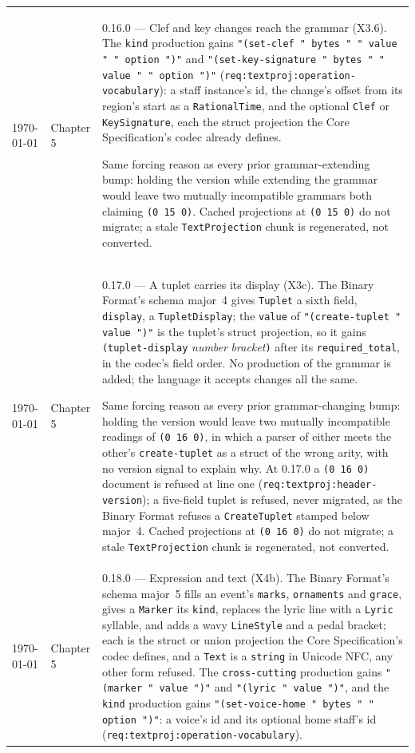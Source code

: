 \documentclass[11pt,letterpaper]{report}
\begin{document}
\begin{longtable}{p{2cm} p{2.5cm} p{9cm}}
    \today & Chapter 5 & 0.16.0 --- Clef and key changes reach the grammar
  (X3.6). The \texttt{kind} production gains
  \texttt{"(set-clef " bytes " " value " " option ")"} and
  \texttt{"(set-key-signature " bytes " " value " " option ")"}
  (\texttt{req:textproj:operation-vocabulary}): a staff instance's id, the
  change's offset from its region's start as a \texttt{RationalTime}, and the
  optional \texttt{Clef} or \texttt{KeySignature}, each the struct
  projection the Core Specification's codec already defines.

  Same forcing reason as every prior grammar-extending bump: holding the
  version while extending the grammar would leave two mutually incompatible
  grammars both claiming \texttt{(0 15 0)}. Cached projections at
  \texttt{(0 15 0)} do not migrate; a stale \texttt{TextProjection} chunk is
  regenerated, not converted. \\

    \today & Chapter 5 & 0.17.0 --- A tuplet carries its display (X3c). The
  Binary Format's schema major~4 gives \texttt{Tuplet} a sixth field,
  \texttt{display}, a \texttt{TupletDisplay}; the \texttt{value} of
  \texttt{"(create-tuplet " value ")"} is the tuplet's struct projection, so it
  gains \texttt{(tuplet-display} \emph{number} \emph{bracket}\texttt{)} after
  its \texttt{required\_total}, in the codec's field order. No production of
  the grammar is added; the language it accepts changes all the same.

  Same forcing reason as every prior grammar-changing bump: holding the version
  would leave two mutually incompatible readings of \texttt{(0 16 0)}, in which
  a parser of either meets the other's \texttt{create-tuplet} as a struct of
  the wrong arity, with no version signal to explain why. At 0.17.0 a
  \texttt{(0 16 0)} document is refused at line one
  (\texttt{req:textproj:header-version}); a five-field tuplet is refused, never
  migrated, as the Binary Format refuses a \texttt{CreateTuplet} stamped below
  major~4. Cached projections at \texttt{(0 16 0)} do not migrate; a stale
  \texttt{TextProjection} chunk is regenerated, not converted. \\

    \today & Chapter 5 & 0.18.0 --- Expression and text (X4b). The Binary
  Format's schema major~5 fills an event's \texttt{marks}, \texttt{ornaments}
  and \texttt{grace}, gives a \texttt{Marker} its \texttt{kind}, replaces the
  lyric line with a \texttt{Lyric} syllable, and adds a wavy
  \texttt{LineStyle} and a pedal bracket; each is the struct or union
  projection the Core Specification's codec defines, and a \texttt{Text} is a
  \texttt{string} in Unicode NFC, any other form refused. The
  \texttt{cross-cutting} production gains \texttt{"(marker " value ")"} and
  \texttt{"(lyric " value ")"}, and the \texttt{kind} production gains
  \texttt{"(set-voice-home " bytes " " option ")"}: a voice's id and its
  optional home staff's id (\texttt{req:textproj:operation-vocabulary}).


\end{longtable}
\end{document}
